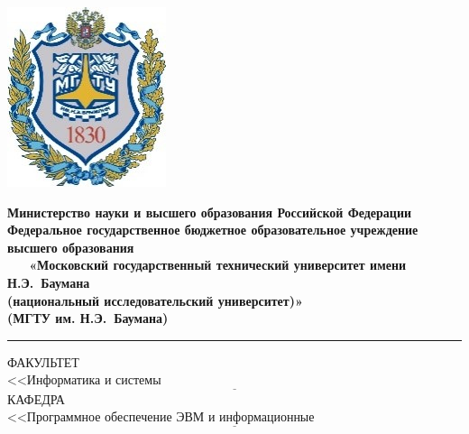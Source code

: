 \thispagestyle{empty}
\begin{titlepage}

\noindent \begin{minipage}{0.15\textwidth}
	\includegraphics[width=\linewidth]{b_logo}
	\end{minipage}
	\noindent\begin{minipage}{0.9\textwidth}\centering
		\textbf{Министерство науки и высшего образования Российской Федерации}\\
		\textbf{Федеральное государственное бюджетное образовательное учреждение высшего образования}\\
		\textbf{~~~«Московский государственный технический университет имени Н.Э.~Баумана}\\
		\textbf{(национальный исследовательский университет)»}\\
		\textbf{(МГТУ им. Н.Э.~Баумана)}
	\end{minipage}
	
	\noindent\rule{18cm}{3pt}
	\newline\newline
	\noindent ФАКУЛЬТЕТ $\underline{\text{<<Информатика и системы управления>>~~~~~~~~~~~~~~~~~~~~~~~~~~~~~~~~~~~~~~~~~~~~~~~~~~~~}}$ \newline\newline
	\noindent КАФЕДРА $\underline{\text{<<Программное обеспечение ЭВМ и информационные технологии>>~~~~~~~~~~~~~~~~~~~~}}$\newline\newline\newline\newline\newline
	

\end{titlepage}
